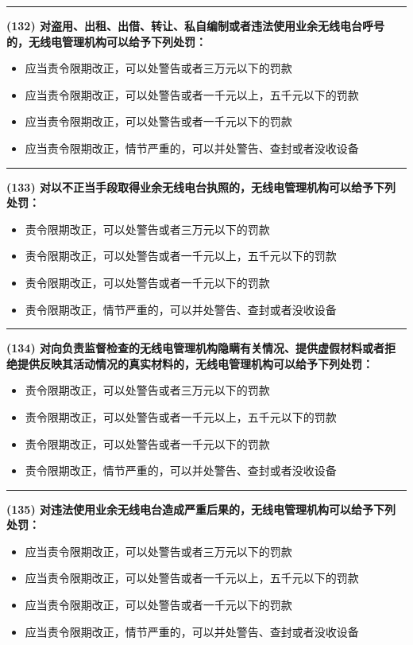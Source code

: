 \documentclass[twocolumn]{ctexart}  %
\begin{document}
\noindent\rule{0.5\textwidth}{1pt}
\heiti \textbf{(132) 对盗用、出租、出借、转让、私自编制或者违法使用业余无线电台呼号的，无线电管理机构可以给予下列处罚：} \songti {\color{gray} [LK0099] }
\begin{itemize}
	\item  应当责令限期改正，可以处警告或者三万元以下的罚款
	\item  应当责令限期改正，可以处警告或者一千元以上，五千元以下的罚款
	\item  应当责令限期改正，可以处警告或者一千元以下的罚款
	\item  应当责令限期改正，情节严重的，可以并处警告、查封或者没收设备
\end{itemize}


\noindent\rule{0.5\textwidth}{1pt}
\heiti \textbf{(133) 对以不正当手段取得业余无线电台执照的，无线电管理机构可以给予下列处罚：} \songti {\color{gray} [LK0100] }
\begin{itemize}
	\item  责令限期改正，可以处警告或者三万元以下的罚款
	\item  责令限期改正，可以处警告或者一千元以上，五千元以下的罚款
	\item  责令限期改正，可以处警告或者一千元以下的罚款
	\item  责令限期改正，情节严重的，可以并处警告、查封或者没收设备
\end{itemize}


\noindent\rule{0.5\textwidth}{1pt}
\heiti \textbf{(134) 对向负责监督检查的无线电管理机构隐瞒有关情况、提供虚假材料或者拒绝提供反映其活动情况的真实材料的，无线电管理机构可以给予下列处罚：} \songti {\color{gray} [LK0101] }
\begin{itemize}
	\item  责令限期改正，可以处警告或者三万元以下的罚款
	\item  责令限期改正，可以处警告或者一千元以上，五千元以下的罚款
	\item  责令限期改正，可以处警告或者一千元以下的罚款
	\item  责令限期改正，情节严重的，可以并处警告、查封或者没收设备
\end{itemize}


\noindent\rule{0.5\textwidth}{1pt}
\heiti \textbf{(135) 对违法使用业余无线电台造成严重后果的，无线电管理机构可以给予下列处罚：} \songti {\color{gray} [LK0102] }
\begin{itemize}
	\item  应当责令限期改正，可以处警告或者三万元以下的罚款
	\item  应当责令限期改正，可以处警告或者一千元以上，五千元以下的罚款
	\item  应当责令限期改正，可以处警告或者一千元以下的罚款
	\item  应当责令限期改正，情节严重的，可以并处警告、查封或者没收设备
\end{itemize}
\end{document}
